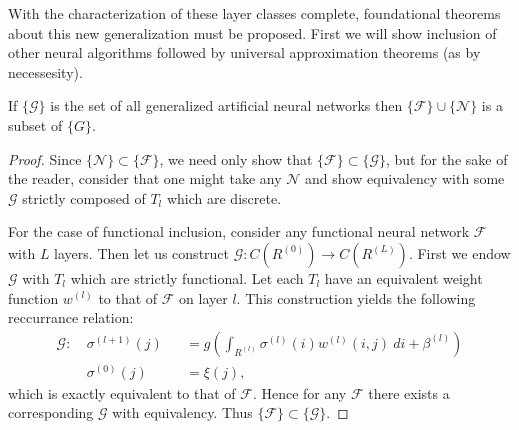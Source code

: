 With the characterization of these layer classes complete, foundational theorems about this new generalization must be proposed. First we will show inclusion of other neural algorithms followed by universal approximation theorems (as by necessesity). 

\begin{theorem}
If $\{\mathcal{G}\}$ is the set of all generalized artificial neural networks then $\{\mathcal{F}\} \cup \{\mathcal{N}\}$ is a subset of $\{G\}$.
\end{theorem}
\begin{proof}
Since $\{\mathcal{N}\} \subset \{\mathcal{F}\}$, we need only show that $\{\mathcal{F}\} \subset \{\mathcal{G}\}$, but for the sake of the reader, consider that one might take any $\mathcal{N}$ and show equivalency with some $\mathcal{G}$ strictly composed of $T_l$ which are discrete.

For the case of functional inclusion, consider any functional neural network $\mathcal{F}$ with $L$ layers. Then let us construct $\mathcal{G} : C\left(R^{(0)}\right) \to C\left(R^{(L)}\right)$. First we endow $\mathcal{G}$ with $T_l$ which are strictly functional. Let each $T_l$ have an equivalent weight function $w^{(l)}$ to that of $\mathcal{F}$ on layer $l$. This construction yields the following reccurrance relation:
\begin{equation}
          \begin{alignedat}{2}
        \mathcal{G}:\ &\sigma^{(l+1)}(j) & &=  g\left(\int_{R^{(l)}} \sigma^{(l)}(i) w^{(l)}(i,j)\ di + \beta^{(l)}\right)  \\
        &\sigma^{(0)}(j) & &= \xi(j), 
        \end{alignedat}
\end{equation}
which is exactly equivalent to that of $\mathcal{F}$. Hence for any $\mathcal{F}$ there exists a corresponding $\mathcal{G}$ with equivalency. Thus $\{\mathcal{F}\} \subset \{\mathcal{G}\}.$
\end{proof}